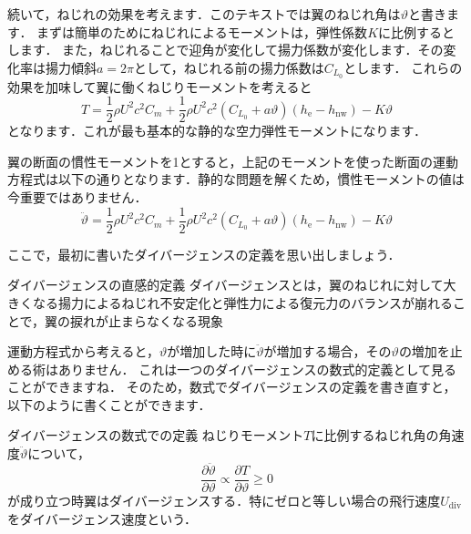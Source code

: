 \documentclass{jarticle}
\begin{document}
続いて，ねじれの効果を考えます．このテキストでは翼のねじれ角は$\vartheta$と書きます．
まずは簡単のためにねじれによるモーメントは，弾性係数$K$に比例するとします．
また，ねじれることで迎角が変化して揚力係数が変化します．その変化率は揚力傾斜$a=2\pi$として，ねじれる前の揚力係数は$C_{L_0}$とします．
これらの効果を加味して翼に働くねじりモーメントを考えると
\begin{equation}
    T = \frac{1}{2}\rho U^2 c^2 C_m + \frac{1}{2}\rho U^2 c^2 (C_{L_0} + a\vartheta)  (h_\mathrm{e}-h_\mathrm{nw}) - K \vartheta
\end{equation}
となります．これが最も基本的な静的な空力弾性モーメントになります．

翼の断面の慣性モーメントを1とすると，上記のモーメントを使った断面の運動方程式は以下の通りとなります．静的な問題を解くため，慣性モーメントの値は今重要ではありません．
\begin{equation}
    \ddot{\vartheta} = \frac{1}{2}\rho U^2 c^2 C_m + \frac{1}{2}\rho U^2 c^2 (C_{L_0} + a\vartheta)  (h_\mathrm{e}-h_\mathrm{nw}) - K \vartheta
\end{equation}

ここで，最初に書いたダイバージェンスの定義を思い出しましょう．
\begin{itembox}[l]{ダイバージェンスの直感的定義}
    ダイバージェンスとは，翼のねじれに対して大きくなる揚力によるねじれ不安定化と弾性力による復元力のバランスが崩れることで，翼の捩れが止まらなくなる現象
\end{itembox}
運動方程式から考えると，$\vartheta$が増加した時に$\ddot{\vartheta}$が増加する場合，その$\vartheta$の増加を止める術はありません．
これは一つのダイバージェンスの数式的定義として見ることができますね．
そのため，数式でダイバージェンスの定義を書き直すと，以下のように書くことができます．
\begin{itembox}[l]{ダイバージェンスの数式での定義}
    ねじりモーメント$T$に比例するねじれ角の角速度$\ddot{\vartheta}$について，
    \begin{equation*}
        \frac{\partial \ddot{\vartheta}}{\partial \vartheta} \propto \frac{\partial T}{\partial \vartheta} \geq 0
    \end{equation*}
    が成り立つ時翼はダイバージェンスする．特にゼロと等しい場合の飛行速度$U_\mathrm{div}$をダイバージェンス速度という．
\end{itembox}
\end{document}
